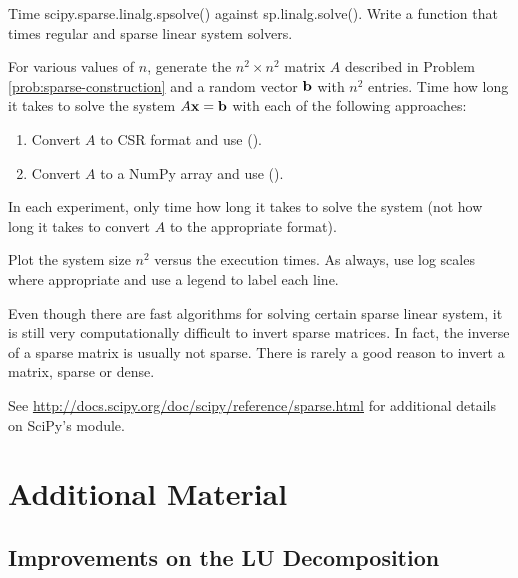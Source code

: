 \begin{problem}{Time scipy.sparse.linalg.spsolve() against sp.linalg.solve().}
Write a function that times regular and sparse linear system solvers.

For various values of $n$, generate the $n^{2} \times n^{2}$ matrix $A$ described in Problem \ref{prob:sparse-construction} and a random vector $\mathbf{b}$ with $n^2$ entries.
Time how long it takes to solve the system $A\mathbf{x} = \mathbf{b}$ with each of the following approaches:
%
\begin{enumerate}
\item Convert $A$ to CSR format and use  ().
\item Convert $A$ to a NumPy array and use  ().
\end{enumerate}
In each experiment, only time how long it takes to solve the system (not how long it takes to convert $A$ to the appropriate format).

Plot the system size $n^{2}$ versus the execution times.
As always, use log scales where appropriate and use a legend to label each line.
\end{problem}

\begin{warn} %
Even though there are fast algorithms for solving certain sparse linear system, it is still very computationally difficult to invert sparse matrices.
In fact, the inverse of a sparse matrix is usually not sparse.
There is rarely a good reason to invert a matrix, sparse or dense.
\end{warn}

See \url{http://docs.scipy.org/doc/scipy/reference/sparse.html} for additional details on SciPy's  module.

\newpage

\section*{Additional Material} %

\subsection*{Improvements on the LU Decomposition} %

